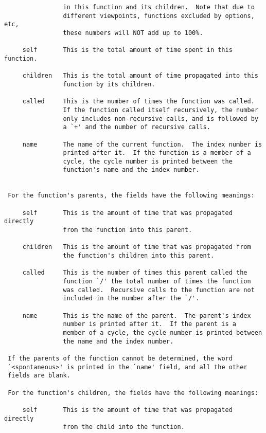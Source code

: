 \documentclass[12pt]{article}
\begin{document}
\begin{lstlisting}[breaklines]
     % time     This is the percentage of the `total' time that was spent
                in this function and its children.  Note that due to
                different viewpoints, functions excluded by options, etc,
                these numbers will NOT add up to 100%.

     self       This is the total amount of time spent in this function.

     children   This is the total amount of time propagated into this
                function by its children.

     called     This is the number of times the function was called.
                If the function called itself recursively, the number
                only includes non-recursive calls, and is followed by
                a `+' and the number of recursive calls.

     name       The name of the current function.  The index number is
                printed after it.  If the function is a member of a
                cycle, the cycle number is printed between the
                function's name and the index number.


 For the function's parents, the fields have the following meanings:

     self       This is the amount of time that was propagated directly
                from the function into this parent.

     children   This is the amount of time that was propagated from
                the function's children into this parent.

     called     This is the number of times this parent called the
                function `/' the total number of times the function
                was called.  Recursive calls to the function are not
                included in the number after the `/'.

     name       This is the name of the parent.  The parent's index
                number is printed after it.  If the parent is a
                member of a cycle, the cycle number is printed between
                the name and the index number.

 If the parents of the function cannot be determined, the word
 `<spontaneous>' is printed in the `name' field, and all the other
 fields are blank.

 For the function's children, the fields have the following meanings:

     self       This is the amount of time that was propagated directly
                from the child into the function.


\end{lstlisting}
\end{document}
